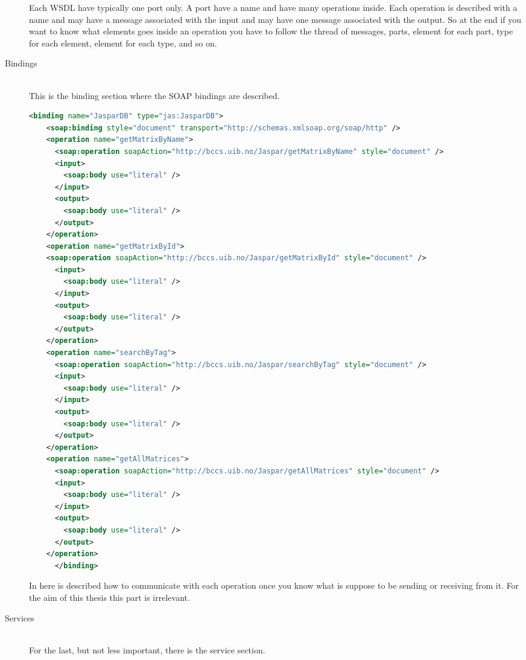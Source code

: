 \documentclass[a4paper,10pt]{article}
\begin{document}
\begin{description}
      Each WSDL have typically one port only. A port have a name and have many operations inside. Each operation is described with a name and may have a message associated with the input and may have one message associated with the output. So at the end if you want to know what elements goes inside an operation you have to follow the thread of messages, parts, element for each part, type for each element, element for each type, and so on.

      \item[Bindings] \hfill \\

      This is the binding section where the SOAP bindings are described.

      \begin{lstlisting}[language=XML]
      <binding name="JasparDB" type="jas:JasparDB">
	<soap:binding style="document" transport="http://schemas.xmlsoap.org/soap/http" />
	<operation name="getMatrixByName">
	  <soap:operation soapAction="http://bccs.uib.no/Jaspar/getMatrixByName" style="document" />
	  <input>
	    <soap:body use="literal" />
	  </input>
	  <output>
	    <soap:body use="literal" />
	  </output>
	</operation>
	<operation name="getMatrixById">
	<soap:operation soapAction="http://bccs.uib.no/Jaspar/getMatrixById" style="document" />
	  <input>
	    <soap:body use="literal" />
	  </input>
	  <output>
	    <soap:body use="literal" />
	  </output>
	</operation>
	<operation name="searchByTag">
	  <soap:operation soapAction="http://bccs.uib.no/Jaspar/searchByTag" style="document" />
	  <input>
	    <soap:body use="literal" />
	  </input>
	  <output>
	    <soap:body use="literal" />
	  </output>
	</operation>
	<operation name="getAllMatrices">
	  <soap:operation soapAction="http://bccs.uib.no/Jaspar/getAllMatrices" style="document" />
	  <input>
	    <soap:body use="literal" />
	  </input>
	  <output>
	    <soap:body use="literal" />
	  </output>
	</operation>
      </binding>
      \end{lstlisting}

      In here is described how to communicate with each operation once you know what is suppose to be sending or receiving from it. For the aim of this thesis this part is irrelevant.

      \item[Services] \hfill \\

      For the last, but not less important, there is the service section. 


\end{description}
\end{document}
